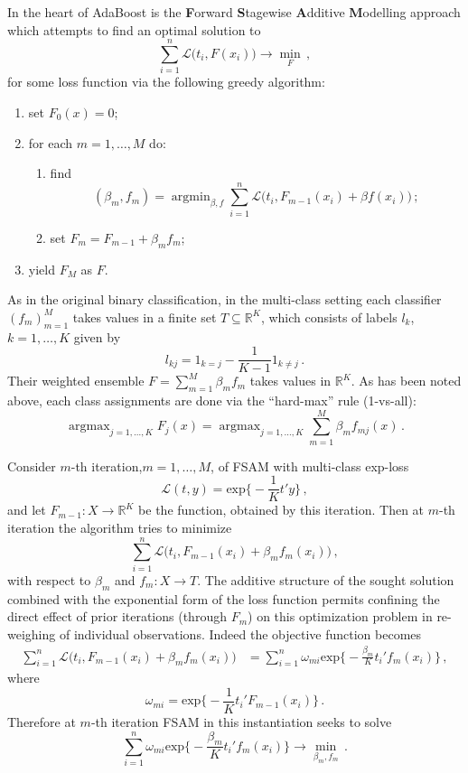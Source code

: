 \documentclass[a4paper]{article}
\newcommand{\Real}{\mathbb{R}}
\newcommand{\argmin}{\mathop{\text{argmin}}}
\newcommand{\argmax}{\mathop{\text{argmax}}}
\begin{document}
In the heart of AdaBoost is the \textbf{F}orward \textbf{S}tagewise \textbf{A}dditive
\textbf{M}odelling approach which attempts to find an optimal solution to
\[ \sum_{i=1}^n \mathcal{L}\bigl(t_i, F(x_i)\bigr) \to \min_F \,,\]
for some loss function via the following greedy algorithm:
\begin{enumerate}
	\item set $F_0(x) = 0$;
	\item for each $m=1,\ldots,M$ do: \begin{enumerate}
		\item find \[
		(\beta_m,f_m) = \argmin_{\beta, f}
			\sum_{i=1}^n \mathcal{L}\bigl(t_i, F_{m-1}(x_i) + \beta f(x_i)\bigr)
		\,; \]
		\item set $F_m = F_{m-1} + \beta_m f_m$;
	\end{enumerate}
	\item yield $F_M$ as $F$.
\end{enumerate}

As in the original binary classification, in the multi-class setting each classifier
$(f_m)_{m=1}^M$ takes values in a finite set $T\subseteq \Real^K$, which consists of
labels $l_k$, $k=1,\ldots, K$ given by
\[ l_{kj} = 1_{k=j} - \frac{1}{K-1} 1_{k\neq j} \,. \]
Their weighted ensemble $F = \sum_{m=1}^M \beta_m f_m$ takes values in $\Real^K$.
As has been noted above, each class assignments are done via the ``hard-max'' rule
(1-vs-all):
\[
\argmax_{j=1,\ldots, K} F_j(x)
	= \argmax_{j=1,\ldots, K} \sum_{m=1}^M \beta_m f_{mj}(x)
\,. \]

Consider $m$-th iteration,$m = 1,\ldots, M$, of FSAM with multi-class exp-loss
\[ \mathcal{L}(t,y) = \text{exp}\bigl\{ -\frac{1}{K} t'y \bigr\} \,, \]
and let $F_{m-1}:X\to \Real^K$ be the function, obtained by this iteration. Then
at $m$-th iteration the algorithm tries to minimize 
\[ \sum_{i=1}^n \mathcal{L}\bigl(t_i,F_{m-1}(x_i) + \beta_m f_m(x_i) \bigr)\,, \]
with respect to $\beta_m$ and $f_m:X\to T$. The additive structure of the sought
solution combined with the exponential form of the loss function permits confining
the direct effect of prior iterations (through $F_m$) on this optimization problem
in re-weighing of individual observations. Indeed the objective function becomes
\begin{align*}
	\sum_{i=1}^n \mathcal{L}\bigl(t_i,F_{m-1}(x_i) + \beta_m f_m(x_i) \bigr)
	&= \sum_{i=1}^n \omega_{mi} \text{exp}\bigl\{ -\frac{\beta_m}{K} t_i' f_m(x_i) \bigr\}\,,
\end{align*}
where
\[ \omega_{mi} = \text{exp}\bigl\{ -\frac{1}{K} t_i'F_{m-1}(x_i) \bigr\} \,. \]
Therefore at $m$-th iteration FSAM in this instantiation seeks to solve
\[ 
\sum_{i=1}^n \omega_{mi} \text{exp}\bigl\{ -\frac{\beta_m}{K} t_i' f_m(x_i) \bigr\}
	\to \min_{\beta_m,f_m}
\,. \]
\end{document}
